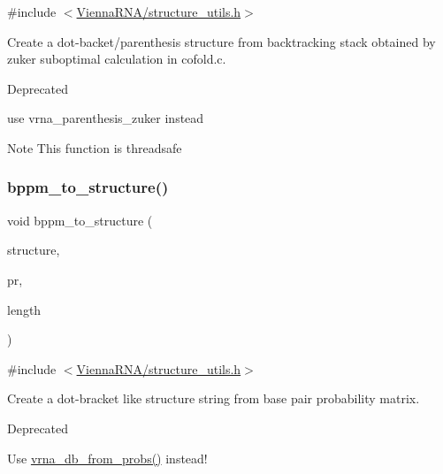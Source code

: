 {\ttfamily \#include $<$\hyperlink{structure__utils_8h}{Vienna\+R\+N\+A/structure\+\_\+utils.\+h}$>$}



Create a dot-\/backet/parenthesis structure from backtracking stack obtained by zuker suboptimal calculation in cofold.\+c. 

\begin{DoxyRefDesc}{Deprecated}
\item[\hyperlink{deprecated__deprecated000149}{Deprecated}]use vrna\+\_\+parenthesis\+\_\+zuker instead\end{DoxyRefDesc}


\begin{DoxyNote}{Note}
This function is threadsafe 
\end{DoxyNote}
\mbox{\label{group__struct__utils_ga129d81c4a1ead793c5b2311333e03dfa}} 
\subsubsection{\texorpdfstring{bppm\+\_\+to\+\_\+structure()}{bppm\_to\_structure()}}
{\footnotesize\ttfamily void bppm\+\_\+to\+\_\+structure (\begin{DoxyParamCaption}\item[{char $\ast$}]{structure,  }\item[{\hyperlink{group__data__structures_ga31125aeace516926bf7f251f759b6126}{F\+L\+T\+\_\+\+O\+R\+\_\+\+D\+BL} $\ast$}]{pr,  }\item[{unsigned int}]{length }\end{DoxyParamCaption})}



{\ttfamily \#include $<$\hyperlink{structure__utils_8h}{Vienna\+R\+N\+A/structure\+\_\+utils.\+h}$>$}



Create a dot-\/bracket like structure string from base pair probability matrix. 

\begin{DoxyRefDesc}{Deprecated}
\item[\hyperlink{deprecated__deprecated000150}{Deprecated}]Use \hyperlink{group__struct__utils_ga0c28c410a5ab22d6ab9c77a84e8d5b44}{vrna\+\_\+db\+\_\+from\+\_\+probs()} instead! \end{DoxyRefDesc}
\mbox{\label{group__struct__utils_ga49962ad6242b8c628de6ca16bb831c1d}} 
